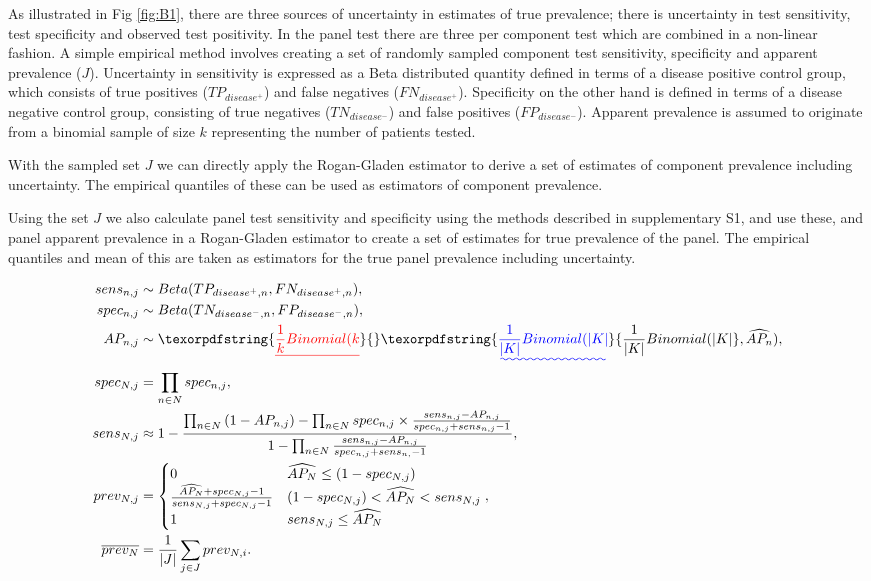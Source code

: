 \documentclass[a4paper, 12pt, twoside]{article}
\providecommand{\DIFaddtex}[1]{{\protect\color{blue}\uwave{#1}}} %
\providecommand{\DIFdeltex}[1]{{\protect\color{red}\sout{#1}}}                      %
\providecommand{\DIFaddbegin}{} %
\providecommand{\DIFaddend}{} %
\providecommand{\DIFdelbegin}{} %
\providecommand{\DIFdelend}{} %
\providecommand{\DIFadd}[1]{\texorpdfstring{\DIFaddtex{#1}}{#1}} %
\providecommand{\DIFdel}[1]{\texorpdfstring{\DIFdeltex{#1}}{}} %
\begin{document}
As illustrated in Fig \ref{fig:B1}, there are three sources of uncertainty in estimates of true prevalence; there is uncertainty in test sensitivity, test specificity and observed test positivity. In the panel test there are three per component test which are combined in a non-linear fashion. A simple empirical method involves creating a set of randomly sampled component test sensitivity, specificity and apparent prevalence (\(J\)). Uncertainty in sensitivity is expressed as a Beta distributed quantity defined in terms of a disease positive control group, which consists of true positives (\(TP_{disease^+}\)) and false negatives (\(FN_{disease^+}\)). Specificity on the other hand is defined in terms of a disease negative control group, consisting of true negatives (\(TN_{disease^-}\)) and false positives (\(FP_{disease^-}\)). Apparent prevalence is assumed to originate from a binomial sample of size \DIFdelbegin \DIFdel{\(k\) }\DIFdelend \DIFaddbegin \DIFadd{\(K\) }\DIFaddend representing the number of patients tested.

With the sampled set \(J\) we can directly apply the Rogan-Gladen estimator to derive a set of estimates of component prevalence including uncertainty. The empirical quantiles of these can be used as estimators of component prevalence.

Using the set \(J\) we also calculate panel test sensitivity and specificity using the methods described in supplementary S1, and use these, and panel apparent prevalence in a Rogan-Gladen estimator \cite{rogan1978} to create a set of estimates for true prevalence of the panel. The empirical quantiles and mean of this are taken as estimators for the true panel prevalence including uncertainty.

\begin{equation*}
\begin{aligned}
sens_{n,j} &\sim Beta(TP_{disease^+,n}, FN_{disease^+,n}), \\
spec_{n,j} &\sim Beta(TN_{disease^-,n}, FP_{disease^-,n}), \\
AP_{n,j} &\sim \DIFdelbegin \DIFdel{\frac{1}{k}Binomial(k}\DIFdelend \DIFaddbegin \DIFadd{\frac{1}{|K|}Binomial(|K|}\DIFaddend , \widehat{AP_n}), \\
spec_{N,j} &= \prod_{n \in N}{spec_{n,j}}, \\
sens_{N,j} &\approx 1-\frac{
  \prod_{n \in N}{(1-AP_{n,j})} - \prod_{n \in N}{spec_{n,j} \times \frac{sens_{n,j}-AP_{n,j}}{spec_{n,j} + sens_{n,j} - 1}}
}{
  1 - \prod_{n \in N}{ \frac{sens_{n,j}-AP_{n,j}}{spec_{n,j} + sens_{n,} - 1} }
}, \\
prev_{N,j} &= \begin{cases}
    0 & \widehat{AP_N} \le (1-spec_{N,j})\\
    \frac{\widehat{AP_N} + spec_{N,j} -1}{sens_{N,j} + spec_{N,j} - 1} & (1-spec_{N,j}) < \widehat{AP_N} < sens_{N,j}\\
    1 & sens_{N,j} \le \widehat{AP_N}
  \end{cases}, \\
\overline{prev_N} &= \frac{1}{|J|}\sum_{j \in J}{prev_{N,i}}.
\end{aligned}
\end{equation*}
\end{document}
